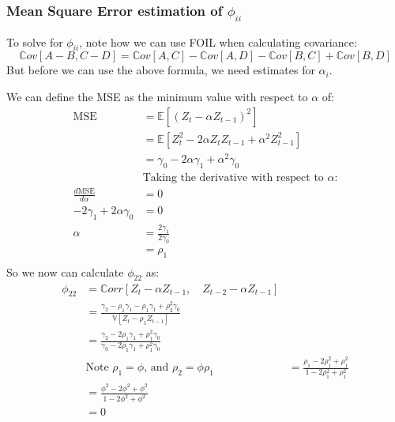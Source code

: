 \subsubsection{Mean Square Error estimation of $\phi_{ii}$}
To solve for $\phi_{ii}$, note how we can use FOIL when calculating
covariance:
\begin{equation*}
    \mathbb{C}ov\left[A - B, C - D\right] = \mathbb{C}ov\left[A, C\right] -
    \mathbb{C}ov\left[A, D\right] - \mathbb{C}ov\left[B, C\right] +
    \mathbb{C}ov\left[B, D\right] 
\end{equation*}
But before we can use the above formula, we need estimates for $\alpha_{i}$.

We can define the MSE as the minimum value with respect to $ \alpha$ of:
\begin{equation*}
    \begin{aligned}
        \text{MSE} &= \mathbb{E}\left[(Z_{t} - \alpha Z_{t-1})^{2}\right] \\
        &= \mathbb{E}\left[Z_{t}^{2} - 2\alpha Z_{t}Z_{t-1} +
        \alpha^{2}Z_{t-1}^{2}\right]  \\
        &= \gamma_{0} - 2\alpha\gamma_{1} + \alpha^{2}\gamma_{0} \\
        &\text{Taking the derivative with respect to $\alpha$:}\\
        \frac{d\text{MSE}}{d\alpha} &= 0 \\
        -2\gamma_{1} + 2\alpha\gamma_{0} &= 0 \\
        \alpha &= \frac{2\gamma_{1}}{2\gamma_{0}} \\
               &= \rho_{1} \\
    \end{aligned}
\end{equation*}
So we now can calculate $\phi_{22}$ as:
\begin{equation*}
    \begin{aligned}
        \phi_{22} &= \mathbb{C}orr\left[Z_{t} - \alpha Z_{t-1},\quad Z_{t-2} -
        \alpha Z_{t-1} \right] \\
                  &= \frac{\gamma_{2} - \rho_{1} \gamma_{1} -
                  \rho_{1}\gamma_{1} + \rho_{2}^{2}\gamma_{0}}{
              \mathbb{V}\left[Z_{t} - \rho_{1} Z_{t-1}\right] } \\
                  &= \frac{\gamma_{2} - 2\rho_{1}\gamma_{1} +
                  \rho_{1}^{2}\gamma_{0}}{\gamma_{0} - 2\rho_{1}\gamma_{1} +
              \rho_{1}^{2}\gamma_{0}} \\
                  &\text{Note $\rho_{1} = \phi$, and $\rho_{2} = \phi \rho_{1}$}
                  &= \frac{\rho_{1} - 2 \rho_{1}^{2} + \rho_{1}^{2}}{1 - 2
                  \rho_{1}^{2} + \rho_{1}^{2}} \\
                  &= \frac{\phi^{2} - 2 \phi^{2} + \phi^{2}}{1 - 2\phi^{2} +
                  \phi^{2}} \\
                  &= 0 \\
    \end{aligned}
\end{equation*}
